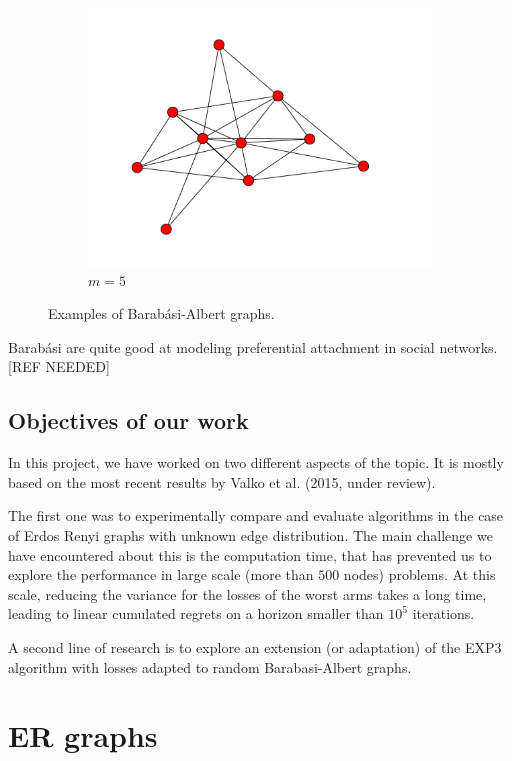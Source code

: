 \documentclass[10pt,a4paper]{scrartcl}
\begin{document}
\begin{figure}[h!]
\begin{center}
\begin{subfigure}[b]{0.3\textwidth}
                \includegraphics[width=\textwidth]{figures/BA_graph_5.pdf}
                \caption{$m=5$}
        \end{subfigure}
\end{center}
\caption{Examples of Barabási-Albert graphs.}
 \label{ba_ex}
\end{figure}
Barabási are quite good at modeling preferential attachment in social networks. [REF NEEDED]


\subsection{Objectives of our work}

In this project, we have worked on two different aspects of the topic. It is mostly based on the most recent results by Valko et al. (2015, under review).

 The first one was to experimentally compare and evaluate algorithms in the case of Erdos Renyi graphs with unknown edge distribution. The main challenge we have encountered about this is the computation time, that has prevented us to explore the performance in large scale (more than $500$ nodes) problems. At this scale, reducing the variance for the losses of the worst arms takes a long time, leading to linear cumulated regrets on a horizon smaller than $10^5$ iterations.

A second line of research is to explore an extension (or adaptation) of the EXP3 algorithm with losses adapted to random Barabasi-Albert graphs.

\section{ER graphs}
\end{document}
